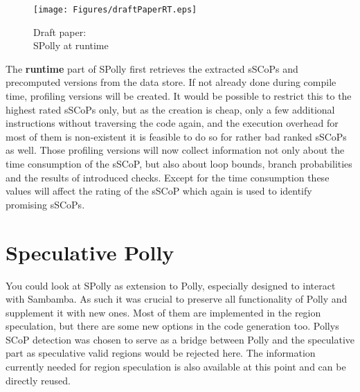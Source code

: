 \begin{figure}
  \centering
  \vspace*{-4mm}
  \texttt{[image: Figures/draftPaperRT.eps]}
  \caption{Draft paper: \\ SPolly at runtime}
  \vspace*{-2mm}
  \label{fig:draftPaperCT}  
\end{figure}
The \textbf{runtime} part of SPolly first retrieves the extracted sSCoPs and 
precomputed versions from the data store. If not already done during  compile
time, profiling versions will be created. It would be possible to restrict
this to the highest rated sSCoPs only, but as the creation is cheap, only 
a few additional instructions without traversing the code again, and the execution 
overhead for most of them is non-existent it is feasible to do so for rather bad
ranked sSCoPs as well.  Those profiling versions will now collect information
not only about the time consumption of the sSCoP, but also about loop bounds,
branch probabilities and the results of introduced checks. Except for the time
consumption these values will affect the rating of the sSCoP which again is used
to identify promising sSCoPs.







\section{Speculative Polly}
You could look at SPolly as extension to Polly, especially designed
to interact with Sambamba. As such it was crucial to preserve all functionality 
of Polly and supplement it with new ones. Most of them are
implemented in the region speculation, but there are some new options in the 
code generation too. Pollys SCoP detection was chosen to serve as a
bridge between Polly and the speculative part as speculative valid regions 
would be rejected here. The information currently needed for region speculation
is also available at this point and can be directly reused. 

